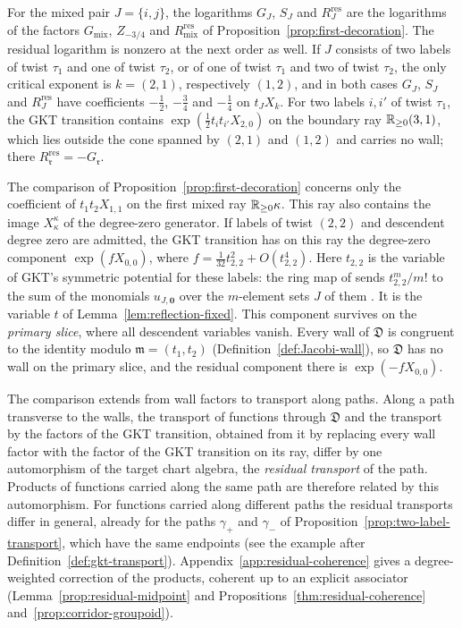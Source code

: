 For the mixed pair $J=\{i,j\}$, the logarithms $G_J$, $S_J$ and $R^{\mathrm{res}}_J$ are
the logarithms of the factors $G_{\mathrm{mix}}$, $Z_{-3/4}$ and
$R^{\mathrm{res}}_{\mathrm{mix}}$ of Proposition~\ref{prop:first-decoration}.  The residual logarithm is
nonzero at the next order as well.  If $J$ consists of two labels of twist
$\tau_1$ and one of twist $\tau_2$, or of one of twist $\tau_1$ and two of
twist $\tau_2$, the only critical exponent is $k=(2,1)$, respectively
$(1,2)$, and in both cases $G_J$, $S_J$ and $R^{\mathrm{res}}_J$ have coefficients
$-\frac12$, $-\frac34$ and $-\frac14$ on $t_JX_k$.  For two labels $i,i'$
of twist $\tau_1$, the GKT
transition contains $\exp(\frac12t_it_{i'}X_{2,0})$ on the boundary ray
$\mathbb R_{\geq0}(3,1)$, which lies outside the cone spanned by $(2,1)$ and $(1,2)$ and
carries no wall; there $R^{\mathrm{res}}_{\mathfrak r}=-G_{\mathfrak r}$.

The comparison of Proposition~\ref{prop:first-decoration} concerns only the
coefficient of $t_1t_2X_{1,1}$ on the first mixed ray $\mathbb R_{\geq0}\kappa$.  This ray also
contains the image $X_\kappa^\kappa$ of the degree-zero generator.  If labels
of twist $(2,2)$ and descendent degree zero are admitted, the GKT transition
has on this ray the degree-zero component $\exp(fX_{0,0})$, where
$f=\frac1{32}t_{2,2}^2+O(t_{2,2}^4)$.  Here $t_{2,2}$ is the variable of
GKT's symmetric potential \cite[Def.~4.12]{grossetal2022open} for these
labels: the ring map of \cite[Lem.~4.14]{grossetal2022open} sends
$t_{2,2}^m/m!$ to the sum of the monomials $u_{J,\mathbf 0}$ over the
$m$-element sets $J$ of them \cite[(4.12)]{grossetal2022open}.  It is the
variable $t$ of Lemma~\ref{lem:reflection-fixed}.  This component survives
on the \emph{primary slice}, where all descendent variables vanish.  Every
wall of $\mathfrak D$ is congruent to the identity modulo $\mathfrak m=(t_1,t_2)$
(Definition~\ref{def:Jacobi-wall}), so $\mathfrak D$ has no wall on the primary
slice, and the residual component there is $\exp(-fX_{0,0})$.

\begin{remark}
\label{rem:products-different-paths}
The comparison extends from wall factors to transport along paths.  Along a
path transverse to the walls, the transport of functions through
$\mathfrak D$ and the transport by the factors of the GKT transition,
obtained from it by replacing every wall factor with the factor of the GKT
transition on its ray, differ by one automorphism
of the target chart algebra, the \emph{residual transport} of the path.
Products of functions carried along the same path are therefore related by
this automorphism.  For functions carried along different paths the residual
transports differ in general, already for the paths $\gamma_+$ and
$\gamma_-$ of Proposition~\ref{prop:two-label-transport}, which have the same
endpoints (see the example after Definition~\ref{def:gkt-transport}).
Appendix~\ref{app:residual-coherence}
gives a degree-weighted correction of the products, coherent up to an
explicit associator (Lemma~\ref{prop:residual-midpoint} and
Propositions~\ref{thm:residual-coherence} and~\ref{prop:corridor-groupoid}).
\end{remark}

